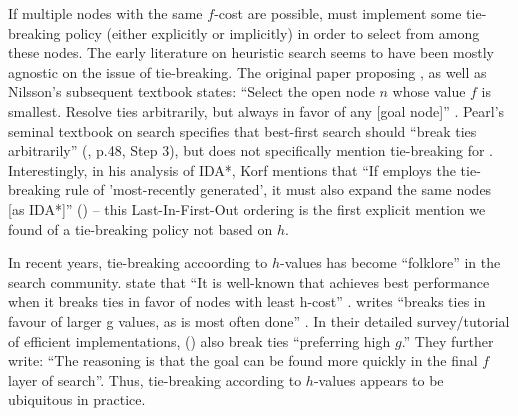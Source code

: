 If multiple nodes with the same $f$-cost are possible, \astar
must implement some tie-breaking policy (either
explicitly or implicitly) in order to select from among these nodes.
The early literature on heuristic search seems to have been mostly agnostic on the issue of tie-breaking.
The original paper proposing \astar, as well as Nilsson's
subsequent textbook states: ``Select the open node $n$ whose value $f$
is smallest. Resolve ties arbitrarily, but always in favor of any [goal
node]'' \cite[p.102 Step 2]{hart1968formal} \cite[p.69]{Nilsson71}.
Pearl's seminal textbook on search specifies that best-first search should ``break ties arbitrarily'' (\citeyear{pearl1984heuristics}, p.48, Step 3), but does not specifically mention tie-breaking for \astar.
Interestingly, in his analysis of IDA*, Korf mentions that ``If \astar employs the tie-breaking rule of 'most-recently generated', it must also expand the same nodes [as IDA*]'' (\citeyear{korf1985depth}) -- this Last-In-First-Out ordering is the first explicit mention we found of a tie-breaking policy not based on $h$.

In recent years, tie-breaking accoording to $h$-values has become ``folklore'' in the search community.
\citeauthor{hansen2007anytime} state that ``It is well-known 
that \astar achieves best performance when it breaks ties
in favor of nodes with least h-cost'' \cite{hansen2007anytime}.
\citeauthor{holte2010common} writes ``\astar breaks ties in favour
of larger g values, as is most often done'' \cite[note that since $f=g+h$,
preferring large $g$ is equivalent to preferring smaller $h$]{holte2010common}.
In their detailed survey/tutorial of efficient \astar implementations,
\citeauthor{burns2012implementing} (\citeyear{burns2012implementing})
also break ties ``preferring high $g$.''  They further write: ``The
reasoning is that the goal can be found more quickly in the final $f$
layer of search''.  Thus, tie-breaking according to $h$-values appears
to be ubiquitous in practice.

